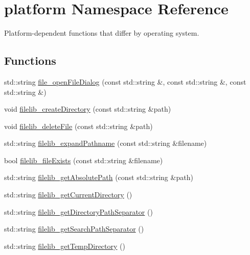 \hypertarget{namespaceplatform}{}\section{platform Namespace Reference}
\label{namespaceplatform}


Platform-\/dependent functions that differ by operating system.  


\subsection*{Functions}
\begin{DoxyCompactItemize}
\item 
std\+::string \mbox{\hyperlink{namespaceplatform_a1b26348d2c3514ce39ed9d5017e4c872}{file\+\_\+open\+File\+Dialog}} (const std\+::string \&, const std\+::string \&, const std\+::string \&)
\item 
void \mbox{\hyperlink{namespaceplatform_aa30655cd42c277a7c5ed7aba21cf0050}{filelib\+\_\+create\+Directory}} (const std\+::string \&path)
\item 
void \mbox{\hyperlink{namespaceplatform_a50db655854102498e7bbc1d5f409a29f}{filelib\+\_\+delete\+File}} (const std\+::string \&path)
\item 
std\+::string \mbox{\hyperlink{namespaceplatform_a7aec69b6d9120eefca74eeba8f7eb02d}{filelib\+\_\+expand\+Pathname}} (const std\+::string \&filename)
\item 
bool \mbox{\hyperlink{namespaceplatform_a7ac56ce70edb176e3d75d83732517d85}{filelib\+\_\+file\+Exists}} (const std\+::string \&filename)
\item 
std\+::string \mbox{\hyperlink{namespaceplatform_acbd0e6215f4690ad235ec00ee8fc82e2}{filelib\+\_\+get\+Absolute\+Path}} (const std\+::string \&path)
\item 
std\+::string \mbox{\hyperlink{namespaceplatform_a52fd33354355f61a96ea88ac33aaa11a}{filelib\+\_\+get\+Current\+Directory}} ()
\item 
std\+::string \mbox{\hyperlink{namespaceplatform_abf9418d14665b0404fd9a942cd890151}{filelib\+\_\+get\+Directory\+Path\+Separator}} ()
\item 
std\+::string \mbox{\hyperlink{namespaceplatform_a9641200cba6781202640c6b723341af2}{filelib\+\_\+get\+Search\+Path\+Separator}} ()
\item 
std\+::string \mbox{\hyperlink{namespaceplatform_a969c5e3fc13cd635656eba2845bc932e}{filelib\+\_\+get\+Temp\+Directory}} ()
\item 

\end{DoxyCompactItemize}
